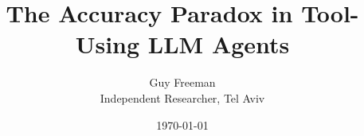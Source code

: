 \documentclass[11pt]{article}
\title{The Accuracy Paradox in Tool-Using LLM Agents}
\author{
  Guy Freeman \\
  Independent Researcher, Tel Aviv
}
\date{\today}
\newcommand{\credence}{\textsc{Credence}}
\begin{document}
\maketitle

\begin{abstract}
\end{abstract}



%

%

%
\end{document}

